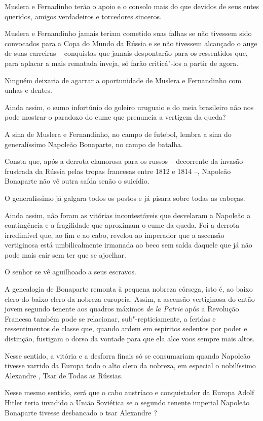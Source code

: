 Muslera e Fernadinho terão o apoio e o consolo mais do que devidos de
seus entes queridos, amigos verdadeiros e torcedores sinceros.

Muslera e Fernandinho jamais teriam cometido suas falhas se não tivessem
sido convocados para a Copa do Mundo da Rússia e se não tivessem
alcançado o auge de suas carreiras -- conquistas que jamais despontarão
para os ressentidos que, para aplacar a mais rematada inveja, só farão
criticá"-los a partir de agora.

Ninguém deixaria de agarrar a oportunidade de Muslera e Fernandinho com
unhas e dentes.

Ainda assim, o sumo infortúnio do goleiro uruguaio e do meia brasileiro
não nos pode mostrar o paradoxo do cume que prenuncia a vertigem da
queda?

A sina de Muslera e Fernandinho, no campo de futebol, lembra a sina do
generalíssimo Napoleão Bonaparte, no campo de batalha.

Consta que, após a derrota clamorosa para os russos -- decorrente da
invasão frustrada da Rússia pelas tropas francesas entre 1812 e 1814 --,
Napoleão Bonaparte não vê outra saída senão o suicídio.

O generalíssimo já galgara todos os postos e já pisara sobre todas as
cabeças.

Ainda assim, não foram as vitórias incontestáveis que desvelaram a
Napoleão a contingência e a fragilidade que aproximam o cume da queda.
Foi a derrota irredimível que, ao fim e ao cabo, revelou ao imperador
que a ascensão vertiginosa está umbilicalmente irmanada ao beco sem
saída daquele que já não pode mais cair sem ter que se ajoelhar.

O senhor se vê aguilhoado a seus escravos.

A genealogia de Bonaparte remonta à pequena nobreza córsega, isto é, ao
baixo clero do baixo clero da nobreza europeia. Assim, a ascensão
vertiginosa do então jovem segundo tenente aos quadros máximos \emph{de
la Patrie} após a Revolução Francesa também pode se relacionar,
sub"-repticiamente, a feridas e ressentimentos de classe que, quando
ardem em espíritos sedentos por poder e distinção, fustigam o dorso da
vontade para que ela alce voos sempre mais altos.

Nesse sentido, a vitória e a desforra finais só se consumariam quando
Napoleão tivesse varrido da Europa todo o alto clero da nobreza, em
especial o nobilíssimo Alexandre , Tsar de Todas as Rússias.

Nesse mesmo sentido, será que o cabo austríaco e conquistador da Europa
Adolf Hitler teria invadido a União Soviética se o segundo tenente
imperial Napoleão Bonaparte tivesse desbancado o tsar Alexandre ?

